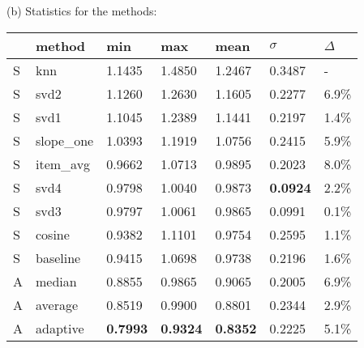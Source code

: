 \begin{table}
  \vspace{1em}
  
  (b) Statistics for the methods:

  \vspace{0.4em}

  \begin{tabular*}{0.47\textwidth}{ l p{1.8cm} l l l l l }
    \hline
    { } & method & min & max & mean & $\sigma$ & $\Delta$ \\
    \hline
    S & knn       	  & 1.1435	& 1.4850	& 1.2467	& 0.3487 & - \\
    S & svd2          & 1.1260	& 1.2630	& 1.1605	& 0.2277 & 6.9\% \\
    S & svd1          & 1.1045	& 1.2389	& 1.1441	& 0.2197 & 1.4\% \\
    S & slope\_one    & 1.0393	& 1.1919	& 1.0756	& 0.2415 & 5.9\% \\
    S & item\_avg     & 0.9662	& 1.0713	& 0.9895	& 0.2023 & 8.0\% \\
    S & svd4          & 0.9798	& 1.0040	& 0.9873	& \textbf{0.0924} & 2.2\% \\
    S & svd3          & 0.9797	& 1.0061	& 0.9865	& 0.0991 & 0.1\% \\
    S & cosine   	    & 0.9382	& 1.1101	& 0.9754	& 0.2595 & 1.1\% \\
    S & baseline       & 0.9415	& 1.0698	& 0.9738	& 0.2196 & 1.6\% \\
    \hline            
    A & median    	  & 0.8855	& 0.9865	& 0.9065	& 0.2005 & 6.9\% \\
    A & average    	  & 0.8519	& 0.9900	& 0.8801	& 0.2344 & 2.9\% \\
    A & adaptive       & \textbf{0.7993}	& \textbf{0.9324}	& \textbf{0.8352}	& 0.2225 & 5.1\% \\
    \hline
  \end{tabular*}
  \label{table:results:e1}
\end{table}

